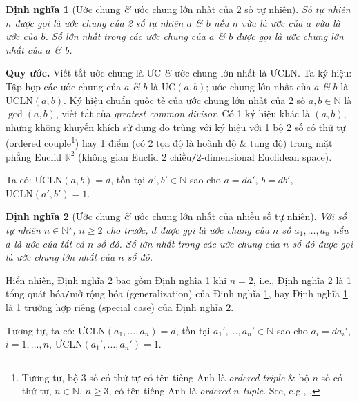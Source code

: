 \documentclass[oneside]{book}
\numberwithin{equation}{section}
\newtheorem{dinhnghia}{Định nghĩa}[section]
\begin{document}
\begin{dinhnghia}[Ước chung \textit{\&} ước chung lớn nhất của 2 số tự nhiên]
	\label{def: ước chung 2 số}
	Số tự nhiên $n$ được gọi là \emph{ước chung} của 2 số tự nhiên $a$ \textit{\&} $b$ nếu $n$ vừa là ước của $a$ vừa là ước của $b$. Số lớn nhất trong các ước chung của $a$ \textit{\&} $b$ được gọi là \emph{ước chung lớn nhất} của $a$ \textit{\&} $b$.
\end{dinhnghia}
\noindent\textbf{Quy ước.} Viết tắt ước chung là ƯC \textit{\&} ước chung lớn nhất là ƯCLN. Ta ký hiệu: Tập hợp các ước chung của $a$ \textit{\&} $b$ là $\mbox{ƯC}(a,b)$; ước chung lớn nhất của $a$ \textit{\&} $b$ là $\mbox{ƯCLN}(a,b)$. Ký hiệu chuẩn quốc tế của ước chung lớn nhất của 2 số $a,b\in\mathbb{N}$ là $\gcd(a,b)$, viết tắt của \textit{greatest common divisor}. Có 1 ký hiệu khác là $(a,b)$, nhưng không khuyến khích sử dụng do trùng với ký hiệu với 1 bộ 2 số có thứ tự (ordered couple\footnote{Tương tự, bộ 3 số có thứ tự có tên tiếng Anh là \textit{ordered triple} \& bộ $n$ số có thứ tự, $n\in\mathbb{N}$, $n\ge 3$, có tên tiếng Anh là \textit{ordered $n$-tuple}. See, e.g., \cite{Rudin1976}.}) hay 1 điểm (có 2 tọa độ là hoành độ \& tung độ) trong mặt phẳng Euclid $\mathbb{R}^2$ (không gian Euclid 2 chiều\texttt{/}2-dimensional Euclidean space).

Ta có: $\mbox{ƯCLN}(a,b)= d$, tồn tại $a',b'\in\mathbb{N}$ sao cho $a = da'$, $b = db'$, $\mbox{ƯCLN}(a',b') = 1$.

\begin{dinhnghia}[Ước chung \textit{\&} ước chung lớn nhất của nhiều số tự nhiên]
	\label{def: ước chung nhiều số}
	Với số tự nhiên $n\in\mathbb{N}^\star$, $n\ge 2$ cho trước, $d$ được gọi là \emph{ước chung} của $n$ số $a_1,\ldots,a_n$ nếu $d$ là ước của tất cả $n$ số đó. Số lớn nhất trong các ước chung của $n$ số đó được gọi là \emph{ước chung lớn nhất} của $n$ số đó.
\end{dinhnghia}
Hiển nhiên, Định nghĩa \ref{def: ước chung nhiều số} bao gồm Định nghĩa \ref{def: ước chung 2 số} khi $n = 2$, i.e., Định nghĩa \ref{def: ước chung nhiều số} là 1 tổng quát hóa\texttt{/}mở rộng hóa (generalization) của Định nghĩa \ref{def: ước chung 2 số}, hay Định nghĩa \ref{def: ước chung 2 số} là 1 trường hợp riêng (special case) của Định nghĩa \ref{def: ước chung nhiều số}.

Tương tự, ta có: $\mbox{ƯCLN}(a_1,\ldots,a_n)= d$, tồn tại $a_1',\ldots,a_n'\in\mathbb{N}$ sao cho $a_i = da_i'$, $i = 1,\ldots, n$, $\mbox{ƯCLN}(a_1',\ldots,a_n') = 1$.
\end{document}
